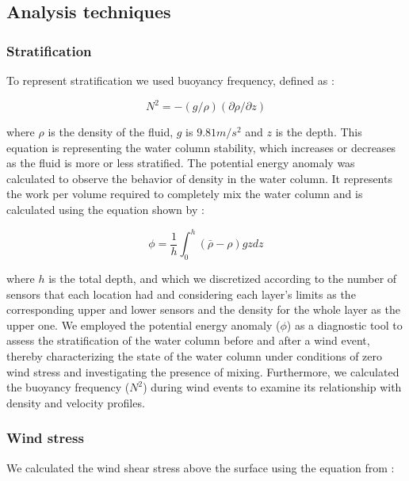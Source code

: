 \documentclass[tesis.tex]{subfiles}
\begin{document}
\subsection{Analysis techniques}

\subsubsection{Stratification}

To represent stratification we used buoyancy frequency, defined as \citep{kundu2002fluid}:

\begin{equation}
    N^2 = -(g/\rho)(\partial \rho/\partial z)
    \label{eq: N2}
\end{equation}

where $\rho$ is the density of the fluid, $g$ is $9.81 m/s^2$ and $z$ is the depth. This equation is representing the water column stability, which increases or decreases as the fluid is more or less stratified. The potential energy anomaly was calculated to observe the behavior of density in the water column. It represents the work per volume required to completely mix the water column and is calculated using the equation shown by \cite{simpson1990tidal}: 

\begin{equation}
    \phi=\frac{1}{h}\int^h_0(\bar{\rho}-\rho)gzdz
    \label{eq: phi}
\end{equation}

where $h$ is the total depth, and which we discretized according to the number of sensors that each location had and considering each layer's limits as the corresponding upper and lower sensors and the density for the whole layer as the upper one. We employed the potential energy anomaly ($\phi$) as a diagnostic tool to assess the stratification of the water column before and after a wind event, thereby characterizing the state of the water column under conditions of zero wind stress and investigating the presence of mixing. Furthermore, we calculated the buoyancy frequency ($N^2$) during wind events to examine its relationship with density and velocity profiles.

\subsubsection{Wind stress}

We calculated the wind shear stress above the surface using the equation from \cite{read2011derivation}: 
\end{document}
